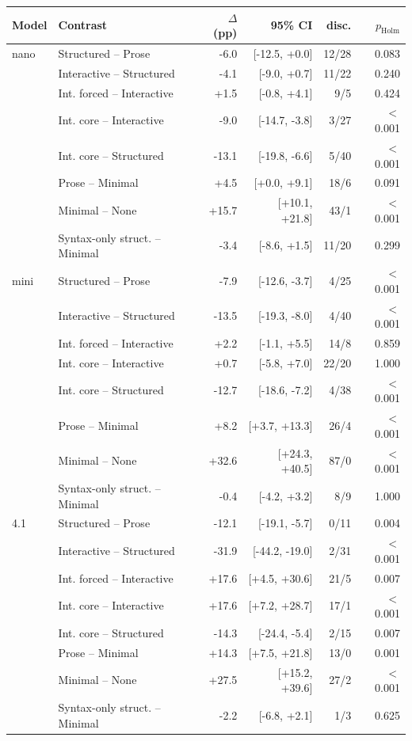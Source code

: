 \begin{tabular}{llrrrr}
\toprule
Model & Contrast & $\Delta$ (pp) & 95\% CI & disc. & $p_\text{Holm}$ \\
\midrule
nano & Structured -- Prose & -6.0 & [-12.5, +0.0] & 12/28 & 0.083 \\
 & Interactive -- Structured & -4.1 & [-9.0, +0.7] & 11/22 & 0.240 \\
 & Int. forced -- Interactive & +1.5 & [-0.8, +4.1] & 9/5 & 0.424 \\
 & Int. core -- Interactive & -9.0 & [-14.7, -3.8] & 3/27 & $<$0.001 \\
 & Int. core -- Structured & -13.1 & [-19.8, -6.6] & 5/40 & $<$0.001 \\
 & Prose -- Minimal & +4.5 & [+0.0, +9.1] & 18/6 & 0.091 \\
 & Minimal -- None & +15.7 & [+10.1, +21.8] & 43/1 & $<$0.001 \\
 & Syntax-only struct. -- Minimal & -3.4 & [-8.6, +1.5] & 11/20 & 0.299 \\
\midrule
mini & Structured -- Prose & -7.9 & [-12.6, -3.7] & 4/25 & $<$0.001 \\
 & Interactive -- Structured & -13.5 & [-19.3, -8.0] & 4/40 & $<$0.001 \\
 & Int. forced -- Interactive & +2.2 & [-1.1, +5.5] & 14/8 & 0.859 \\
 & Int. core -- Interactive & +0.7 & [-5.8, +7.0] & 22/20 & 1.000 \\
 & Int. core -- Structured & -12.7 & [-18.6, -7.2] & 4/38 & $<$0.001 \\
 & Prose -- Minimal & +8.2 & [+3.7, +13.3] & 26/4 & $<$0.001 \\
 & Minimal -- None & +32.6 & [+24.3, +40.5] & 87/0 & $<$0.001 \\
 & Syntax-only struct. -- Minimal & -0.4 & [-4.2, +3.2] & 8/9 & 1.000 \\
\midrule
4.1 & Structured -- Prose & -12.1 & [-19.1, -5.7] & 0/11 & 0.004 \\
 & Interactive -- Structured & -31.9 & [-44.2, -19.0] & 2/31 & $<$0.001 \\
 & Int. forced -- Interactive & +17.6 & [+4.5, +30.6] & 21/5 & 0.007 \\
 & Int. core -- Interactive & +17.6 & [+7.2, +28.7] & 17/1 & $<$0.001 \\
 & Int. core -- Structured & -14.3 & [-24.4, -5.4] & 2/15 & 0.007 \\
 & Prose -- Minimal & +14.3 & [+7.5, +21.8] & 13/0 & 0.001 \\
 & Minimal -- None & +27.5 & [+15.2, +39.6] & 27/2 & $<$0.001 \\
 & Syntax-only struct. -- Minimal & -2.2 & [-6.8, +2.1] & 1/3 & 0.625 \\
\bottomrule
\end{tabular}